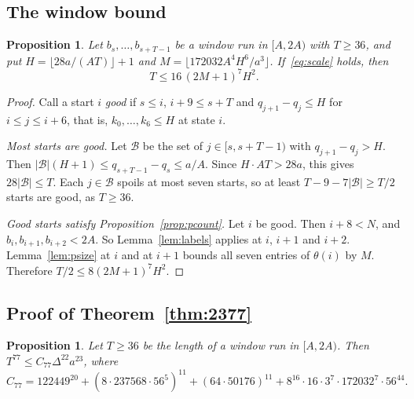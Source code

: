 \documentclass[11pt]{amsart}
\newtheorem{proposition}[theorem]{Proposition}
\theoremstyle{definition}
\theoremstyle{remark}
\begin{document}
\subsection{The window bound}

\begin{proposition}\label{prop:twostate}
Let $b_s,\dots,b_{s+T-1}$ be a window run in $[A,2A)$ with $T\ge36$, and put
$H=\lfloor 28a/(AT)\rfloor+1$ and $M=\lfloor172032A^4H^6/a^3\rfloor$. If~\eqref{eq:scale}
holds, then
\[
T\le 16\,(2M+1)^7H^2 .
\]
\end{proposition}

\begin{proof}
Call a start $i$ \emph{good} if $s\le i$, $i+9\le s+T$ and $q_{j+1}-q_j\le H$ for $i\le j\le i+6$,
that is, $k_0,\dots,k_6\le H$ at state $i$.

\emph{Most starts are good.} Let $\mathcal B$ be the set of $j\in[s,s+T-1)$ with $q_{j+1}-q_j>H$. Then
$|\mathcal B|(H+1)\le q_{s+T-1}-q_s\le a/A$. Since $H\cdot AT>28a$, this gives
$28|\mathcal B|\le T$. Each $j\in\mathcal B$ spoils at most seven starts, so at least
$T-9-7|\mathcal B|\ge T/2$ starts are good, as $T\ge36$.

\emph{Good starts satisfy Proposition~\ref{prop:pcount}.} Let $i$ be good. Then $i+8<N$, and
$b_i,b_{i+1},b_{i+2}<2A$. So Lemma~\ref{lem:labels} applies at $i$, $i+1$ and $i+2$.
Lemma~\ref{lem:psize} at $i$ and at $i+1$ bounds all seven entries of $\theta(i)$ by $M$.
Therefore $T/2\le 8(2M+1)^7H^2$.
\end{proof}

\subsection{Proof of Theorem~\ref{thm:2377}}

\begin{proposition}\label{prop:77}
Let $T\ge36$ be the length of a window run in $[A,2A)$. Then $T^{77}\le C_{77}\Delta^{22}a^{23}$,
where
\[
C_{77}=122449^{20}+(8\cdot237568\cdot56^5)^{11}+(64\cdot50176)^{11}
+8^{16}\cdot16\cdot3^7\cdot172032^7\cdot56^{44}.
\]
\end{proposition}
\end{document}
